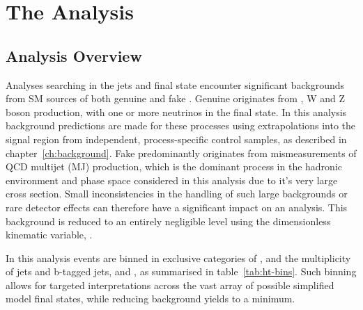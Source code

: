 \chapter{The \alphat Analysis}
\label{ch:analysis}

\ifpdf
    \graphicspath{{Chapter5/Figs/Raster/}{Chapter5/Figs/PDF/}{Chapter5/Figs/}}
\else
    \graphicspath{{Chapter5/Figs/Vector/}{Chapter5/Figs/}}
\fi


\section{Analysis Overview}  %
\label{sec:selection_analysis_overview}

Analyses searching in the jets and \met final state encounter significant 
backgrounds from SM sources of both genuine and fake \met. Genuine \met 
originates from \ttbar, W and Z boson production, with one or more
neutrinos in the final state. In this analysis background predictions are made
for these processes using 
extrapolations into the signal region from independent, process-specific control
samples, as described in chapter~\ref{ch:background}.
Fake \met predominantly originates from mismeasurements of QCD 
multijet (MJ) production, which is the dominant process in the hadronic
environment
and  phase space considered in this analysis due to it's very large cross
section.  Small inconsistencies in the handling of such large backgrounds or
rare detector effects can therefore 
have a significant impact on an analysis. This background is reduced to an 
entirely negligible level using the dimensionless kinematic variable, \alphat.


In this analysis events are binned in exclusive categories of \HT, 
and the multiplicity of jets and b-tagged jets,  
\nj and \nb, as summarised in table~\ref{tab:ht-bins}. Such binning allows for
targeted interpretations across the vast array of
possible simplified model final states, while reducing background yields to a 
minimum.

